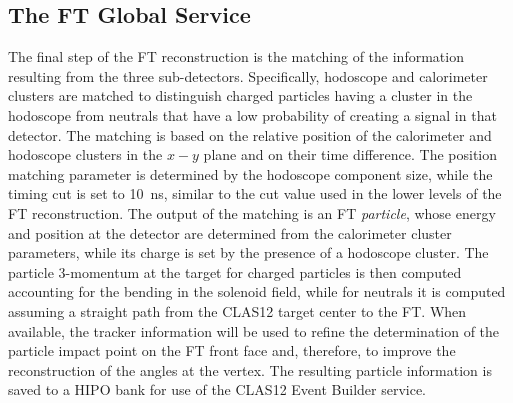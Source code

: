\subsection{The FT Global Service}

The final step of the FT reconstruction is the matching of the information resulting from the three sub-detectors.
Specifically, hodoscope and calorimeter clusters are matched to distinguish charged particles having a cluster in the
hodoscope from neutrals that have a low probability of creating a signal in that detector. The matching is based on
the relative position of the calorimeter and hodoscope clusters in the $x-y$ plane and on their time difference. The
position matching parameter is determined by the hodoscope component size, while the timing cut is set to 10~ns,
similar to the cut value used in the lower levels of the FT reconstruction. The output of the matching is an FT
{\it particle}, whose energy and position at the detector are determined from the calorimeter cluster parameters,
while its charge is set by the presence of a hodoscope cluster. The particle 3-momentum at the target for charged
particles is then computed accounting for the bending in the solenoid field, while for neutrals it is computed assuming
a straight path from the CLAS12 target center to the FT. When available, the tracker information will be used to
refine the determination of the particle impact point on the FT front face and, therefore, to improve the
reconstruction of the angles at the vertex. The resulting particle information is saved to a HIPO bank for use of
the CLAS12 Event Builder service.
